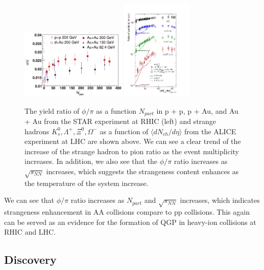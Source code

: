 \begin{figure}[hbtp]
\begin{center}
\includegraphics[width=0.45\textwidth]{Figures/Chapter1/STARPhiOverPi.png}
\includegraphics[width=0.30\textwidth]{Figures/Chapter1/ALICEStrange.png}
\caption{The yield ratio of $\phi/\pi$ as a function $N_{part}$ in p + p, p + Au, and Au + Au from the STAR experiment at RHIC (left) and strange hadrons $K^0_s, \Lambda^+, \Xi^0, \Omega^-$ as a function of $\langle dN_{ch}/d\eta \rangle$ from the ALICE experiment at LHC are shown above. We can see a clear trend of the increase of the strange hadron to pion ratio as the event multiplicity increases. In addition, we also see that the $\phi/\pi$ ratio increases as $\sqrt {s_{NN}}$ increases, which suggests the strangeness content enhances as the temperature of the system increase.}
\label{PhiRAA}
\end{center}
\end{figure}   

We can see that $\phi/\pi$ ratio increases as $N_{part}$ and $\sqrt {s_{NN}}$ increases, which indicates strangeness enhancement in AA collisions compare to pp collisions. This again can be served as an evidence for the formation of QGP in heavy-ion collisions at RHIC and LHC. 


\subsection{Discovery}

